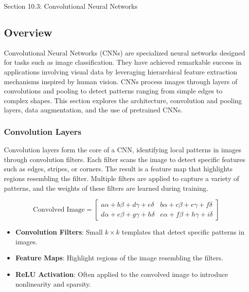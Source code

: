 \begin{notes}{Section 10.3: Convolutional Neural Networks}
    \subsection*{Overview}

    Convolutional Neural Networks (CNNs) are specialized neural networks designed for tasks such as image classification. They have achieved remarkable success in applications involving visual data by 
    leveraging hierarchical feature extraction mechanisms inspired by human vision. CNNs process images through layers of convolutions and pooling to detect patterns ranging from simple edges to complex 
    shapes. This section explores the architecture, convolution and pooling layers, data augmentation, and the use of pretrained CNNs.
    
    \subsubsection*{Convolution Layers}
    
    Convolution layers form the core of a CNN, identifying local patterns in images through convolution filters. Each filter scans the image to detect specific features such as edges, stripes, or corners. The 
    result is a feature map that highlights regions resembling the filter. Multiple filters are applied to capture a variety of patterns, and the weights of these filters are learned during training.
    
    \[
    \text{Convolved Image} =
    \begin{bmatrix}
        a\alpha + b\beta + d\gamma + e\delta & b\alpha + c\beta + e\gamma + f\delta \\
        d\alpha + e\beta + g\gamma + h\delta & e\alpha + f\beta + h\gamma + i\delta
    \end{bmatrix}
    \]
    
    \begin{highlight}
        \begin{itemize}
            \item \textbf{Convolution Filters}: Small \(k \times k\) templates that detect specific patterns in images.
            \item \textbf{Feature Maps}: Highlight regions of the image resembling the filters.
            \item \textbf{ReLU Activation}: Often applied to the convolved image to introduce nonlinearity and sparsity.
        \end{itemize}
    \end{highlight}
    

\end{notes}
